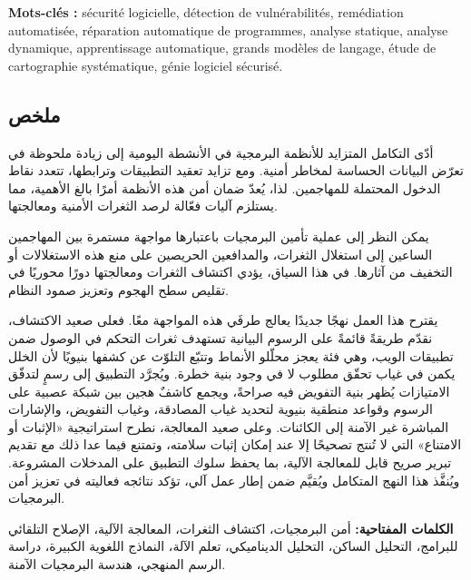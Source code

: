 \documentclass[11pt,a4paper]{report}
\begin{document}
\medskip
\noindent\textbf{Mots-clés :} sécurité logicielle, détection de vulnérabilités,
remédiation automatisée, réparation automatique de programmes, analyse statique,
analyse dynamique, apprentissage automatique, grands modèles de langage, étude de
cartographie systématique, génie logiciel sécurisé.

\begin{Arabic}

\chapter*{ملخص}

\begin{flushright}

أدّى التكامل المتزايد للأنظمة البرمجية في الأنشطة اليومية إلى زيادة ملحوظة في تعرّض
البيانات الحساسة لمخاطر أمنية. ومع تزايد تعقيد التطبيقات وترابطها، تتعدد نقاط الدخول
المحتملة للمهاجمين. لذا، يُعدّ ضمان أمن هذه الأنظمة أمرًا بالغ الأهمية، مما يستلزم
آليات فعّالة لرصد الثغرات الأمنية ومعالجتها.

\medskip
يمكن النظر إلى عملية تأمين البرمجيات باعتبارها مواجهة مستمرة بين المهاجمين الساعين
إلى استغلال الثغرات، والمدافعين الحريصين على منع هذه الاستغلالات أو التخفيف من آثارها.
في هذا السياق، يؤدي اكتشاف الثغرات ومعالجتها دورًا محوريًا في تقليص سطح الهجوم
وتعزيز صمود النظام.

\medskip
يقترح هذا العمل نهجًا جديدًا يعالج طرفَي هذه المواجهة معًا. فعلى صعيد الاكتشاف، نقدّم
طريقةً قائمةً على الرسوم البيانية تستهدف ثغرات التحكم في الوصول ضمن تطبيقات الويب، وهي فئة
يعجز محلّلو الأنماط وتتبّع التلوّث عن كشفها بنيويًا لأن الخلل يكمن في غياب تحقّق مطلوب لا في
وجود بنية خطرة. ويُجرَّد التطبيق إلى رسمٍ لتدفّق الامتيازات يُظهر بنية التفويض فيه صراحةً،
ويجمع كاشفٌ هجين بين شبكة عصبية على الرسوم وقواعد منطقية بنيوية لتحديد غياب المصادقة، وغياب
التفويض، والإشارات المباشرة غير الآمنة إلى الكائنات. وعلى صعيد المعالجة، نطرح استراتيجية «الإثبات أو
الامتناع» التي لا تُنتج تصحيحًا إلا عند إمكان إثبات سلامته، وتمتنع فيما عدا ذلك مع
تقديم تبرير صريح قابل للمعالجة الآلية، بما يحفظ سلوك التطبيق على المدخلات المشروعة.
ويُنفَّذ هذا النهج المتكامل ويُقيَّم ضمن إطار عمل آلي، تؤكد نتائجه فعاليته في تعزيز
أمن البرمجيات.

\medskip
\textbf{الكلمات المفتاحية:} أمن البرمجيات، اكتشاف الثغرات، المعالجة الآلية،
الإصلاح التلقائي للبرامج، التحليل الساكن، التحليل الديناميكي، تعلم الآلة،
النماذج اللغوية الكبيرة، دراسة الرسم المنهجي، هندسة البرمجيات الآمنة.

\end{flushright}
\end{Arabic}
\end{document}
